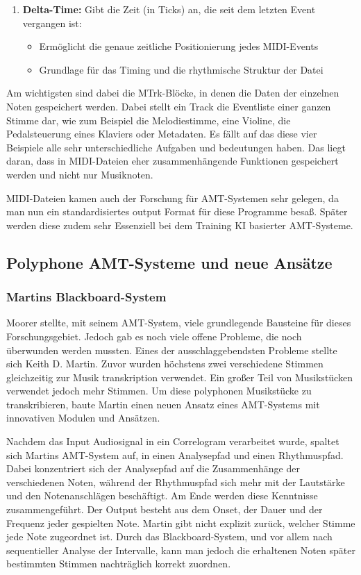 \begin{enumerate}
    \item \textbf{Delta-Time:} Gibt die Zeit (in Ticks) an, die seit dem letzten Event vergangen ist:
    \begin{itemize}
        \item Ermöglicht die genaue zeitliche Positionierung jedes MIDI-Events
        \item Grundlage für das Timing und die rhythmische Struktur der Datei
    \end{itemize}
\end{enumerate}
Am wichtigsten sind dabei die MTrk-Blöcke, in denen die Daten der einzelnen Noten gespeichert werden.
Dabei stellt ein Track die Eventliste einer ganzen Stimme dar,
wie zum Beispiel die Melodiestimme, eine Violine, die Pedalsteuerung eines Klaviers oder Metadaten.
Es fällt auf das diese vier Beispiele alle sehr unterschiedliche Aufgaben und bedeutungen haben.
Das liegt daran, dass in MIDI-Dateien eher zusammenhängende Funktionen gespeichert werden und nicht nur Musiknoten.

MIDI-Dateien kamen auch der Forschung für AMT-Systemen sehr gelegen,
da man nun ein standardisiertes output Format für diese Programme besaß.
Später werden diese zudem sehr Essenziell bei dem Training KI basierter AMT-Systeme.
\cite{telila2025cnn}

\subsection{Polyphone AMT-Systeme und neue Ansätze}
\subsubsection{Martins Blackboard-System}
Moorer stellte, mit seinem AMT-System, viele grundlegende Bausteine für dieses Forschungsgebiet.
Jedoch gab es noch viele offene Probleme, die noch überwunden werden mussten.
Eines der ausschlaggebendsten Probleme stellte sich Keith D. Martin.
\cite{Martin1996}
Zuvor wurden höchstens zwei verschiedene Stimmen gleichzeitig zur Musik transkription verwendet.
Ein großer Teil von Musikstücken verwendet jedoch mehr Stimmen.
Um diese polyphonen Musikstücke zu transkribieren,
baute Martin einen neuen Ansatz eines AMT-Systems mit innovativen Modulen und Ansätzen.

Nachdem das Input Audiosignal in ein Correlogram verarbeitet wurde,
spaltet sich Martins AMT-System auf, in einen Analysepfad und einen Rhythmuspfad.
Dabei konzentriert sich der Analysepfad auf die Zusammenhänge der verschiedenen Noten,
während der Rhythmuspfad sich mehr mit der Lautstärke und den Notenanschlägen beschäftigt.
Am Ende werden diese Kenntnisse zusammengeführt.
Der Output besteht aus dem Onset, der Dauer und der Frequenz jeder gespielten Note.
Martin gibt nicht explizit zurück, welcher Stimme jede Note zugeordnet ist.
Durch das Blackboard-System, und vor allem nach sequentieller Analyse der Intervalle, kann man
jedoch die erhaltenen Noten später bestimmten Stimmen nachträglich korrekt zuordnen.

